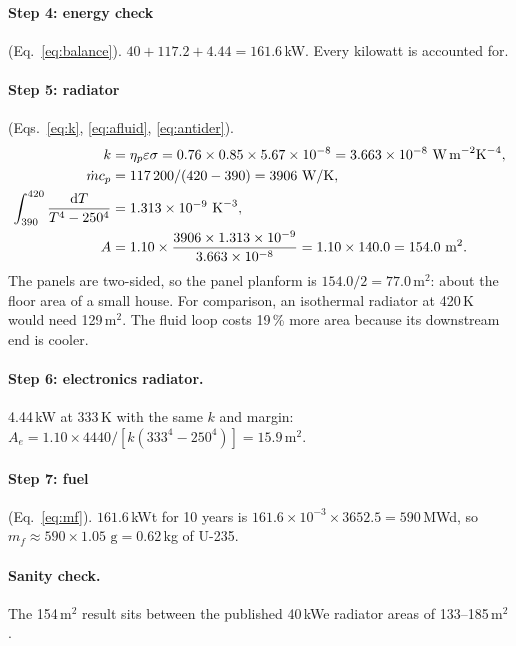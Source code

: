 \documentclass[11pt]{article}
\numberwithin{equation}{section}
\numberwithin{table}{section}
\begin{document}
\paragraph{Step 4: energy check} (Eq.~\eqref{eq:balance}).
$40 + 117.2 + 4.44 = 161.6$\,kW. Every kilowatt is accounted for.

\paragraph{Step 5: radiator} (Eqs.~\eqref{eq:k}, \eqref{eq:afluid}, \eqref{eq:antider}).
\begin{align*}
k &= \eta_p\varepsilon\sigma = 0.76\times0.85\times5.67\times10^{-8} = 3.663\times10^{-8}\ \text{W\,m}^{-2}\text{K}^{-4},\\
\dot m c_p &= 117\,200/(420-390) = 3906\ \text{W/K},\\
\int_{390}^{420}\frac{\mathrm{d}T}{T^4-250^4} &= 1.313\times10^{-9}\ \text{K}^{-3},\\
A &= 1.10\times\frac{3906\times1.313\times10^{-9}}{3.663\times10^{-8}} = 1.10\times140.0 = 154.0\ \text{m}^2 .
\end{align*}
The panels are two-sided, so the panel planform is $154.0/2 = 77.0$\,m$^2$: about the floor
area of a small house. For comparison, an isothermal radiator at 420\,K would need
129\,m$^2$. The fluid loop costs 19\,\% more area because its downstream end is cooler.

\paragraph{Step 6: electronics radiator.}
4.44\,kW at 333\,K with the same $k$ and margin: $A_e = 1.10\times4440/[k(333^4-250^4)] = 15.9$\,m$^2$.

\paragraph{Step 7: fuel} (Eq.~\eqref{eq:mf}).
$161.6$\,kWt for 10 years is $161.6\times10^{-3}\times3652.5 = 590$\,MWd, so
$m_f\approx590\times1.05\text{ g}=0.62$\,kg of U-235.

\paragraph{Sanity check.} The 154\,m$^2$ result sits between the published 40\,kWe radiator
areas of 133--185\,m$^2$ \cite{fsp2010icd,mason2025trades,oleson2022deployable}.

\end{document}
